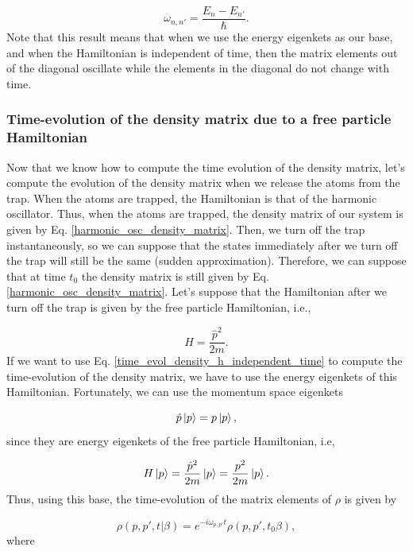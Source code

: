 \documentclass{article}
\begin{document}
\begin{equation}
    \omega_{n,n'} = \frac{E_{n}-E_{n'}}{\hbar}.
\end{equation}
%
Note that this result means that when we use the energy eigenkets as our base, and when the Hamiltonian is independent of time, then the matrix elements out of the diagonal oscillate while the elements in the diagonal do not change with time.

\subsubsection{Time-evolution of the density matrix due to a free particle Hamiltonian}
Now that we know how to compute the time evolution of the density matrix, let's compute the evolution of the density matrix when we release the atoms from the trap. When the atoms are trapped, the Hamiltonian is that of the harmonic oscillator. Thus, when the atoms are trapped, the density matrix of our system is given by Eq. \ref{harmonic_osc_density_matrix}. Then, we turn off the trap instantaneously, so we can suppose that the states immediately after we turn off the trap will still be the same (sudden approximation). Therefore, we can suppose that at time $t_{0}$ the density matrix is still given by Eq. \ref{harmonic_osc_density_matrix}. Let's suppose that the Hamiltonian after we turn off the trap is given by the free particle Hamiltonian, i.e.,

\begin{equation*}
    H = \frac{\hat{p}^{2}}{2m}.
\end{equation*}
%
If we want to use Eq. \ref{time_evol_density_h_independent_time} to compute the time-evolution of the density matrix, we have to use the energy eigenkets of this Hamiltonian. Fortunately, we can use the momentum space eigenkets

\begin{equation}
    \hat{p}\ket{p} = p \ket{p},
\end{equation}
%
since they are energy eigenkets of the free particle Hamiltonian, i.e,

\begin{equation}
   H \ket{p} = \frac{\hat{p}^{2}}{2m} \ket{p} = \frac{p^{2}}{2m} \ket{p}.
\end{equation}
%
Thus, using this base, the time-evolution of the matrix elements of $\rho$ is given by

\begin{equation}\label{time_evo_energy_eigenkets}
    \rho(p,p',t|\beta) = e^{-i\omega_{p,p'}t} \rho(p,p',t_{0}\beta),
\end{equation}
%
where
\end{document}
